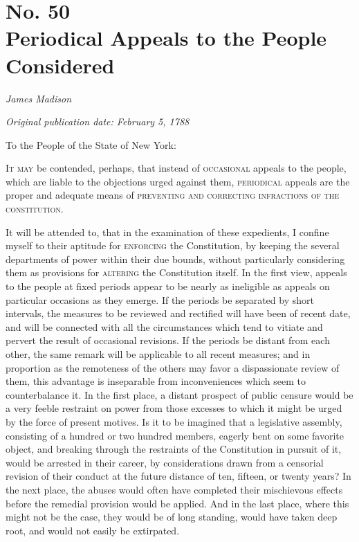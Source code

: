 \chapter[No. 50: Periodical Appeals to the People Considered]{No. 50\\ {\small Periodical Appeals to the People Considered}}

\textit{James Madison}

\textit{Original publication date: February 5, 1788}
\vspace{1cm}

To the People of the State of New York:
\vspace{.4cm}

\textsc{It may} be contended, perhaps, that instead of \textsc{occasional} appeals to the people, which are liable to the objections urged against them, \textsc{periodical} appeals are the proper and adequate means of \textsc{preventing and correcting infractions of the constitution}.

It will be attended to, that in the examination of these expedients, I confine myself to their aptitude for \textsc{enforcing} the Constitution, by keeping the several departments of power within their due bounds, without particularly considering them as provisions for \textsc{altering} the Constitution itself. 
In the first view, appeals to the people at fixed periods appear to be nearly as ineligible as appeals on particular occasions as they emerge. 
If the periods be separated by short intervals, the measures to be reviewed and rectified will have been of recent date, and will be connected with all the circumstances which tend to vitiate and pervert the result of occasional revisions. 
If the periods be distant from each other, the same remark will be applicable to all recent measures; and in proportion as the remoteness of the others may favor a dispassionate review of them, this advantage is inseparable from inconveniences which seem to counterbalance it. 
In the first place, a distant prospect of public censure would be a very feeble restraint on power from those excesses to which it might be urged by the force of present motives. 
Is it to be imagined that a legislative assembly, consisting of a hundred or two hundred members, eagerly bent on some favorite object, and breaking through the restraints of the Constitution in pursuit of it, would be arrested in their career, by considerations drawn from a censorial revision of their conduct at the future distance of ten, fifteen, or twenty years? 
In the next place, the abuses would often have completed their mischievous effects before the remedial provision would be applied. 
And in the last place, where this might not be the case, they would be of long standing, would have taken deep root, and would not easily be extirpated.

